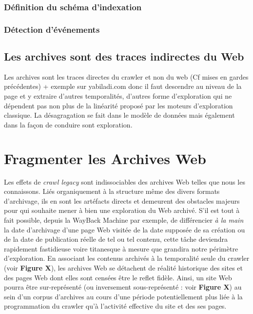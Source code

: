 \documentclass{tufte-book}
\begin{document}
\subsection{Définition du schéma d'indexation}

\subsection{Détection d'événements}

\section{Les archives sont des traces indirectes du Web}

Les archives sont les traces directes du crawler et non du web (Cf mises en gardes précédentes) + exemple sur yabiladi.com donc il faut descendre au niveau de la page et y extraire d'autres temporalités, d'autres forme d'exploration qui ne dépendent pas non plus de la linéarité proposé par les moteurs d'exploration classique.
La désagragation se fait dans le modèle de données mais également dans la façon de conduire sont exploration. 


\chapter{Fragmenter les Archives Web}

\par\noindent Les effets de \textit{crawl legacy} sont indissociables des archives Web telles que nous les connaissons. Liés organiquement à la structure même des divers formats d'archivage, ils en sont les artéfacts directs et demeurent des obstacles majeurs pour qui souhaite mener à bien une exploration du Web archivé. S'il est tout à fait possible, depuis la WayBack Machine par exemple, de différencier \textit{à la main} la date d'archivage d'une page Web visitée de la date supposée de sa création ou de la date de publication réelle de tel ou tel contenu, cette tâche deviendra rapidement fastidieuse voire titanesque à mesure que grandira notre périmètre d'exploration. En associant les contenus archivés à la temporalité seule du crawler (voir \textbf{Figure X}), les archives Web se détachent de réalité historique des sites et des pages Web dont elles sont censées être le reflet fidèle. Ainsi, un site Web pourra être sur-représenté (ou inversement sous-représenté : voir \textbf{Figure X}) au sein d'un corpus d'archives au cours d'une période potentiellement plus liée à la programmation du crawler qu'à l'activité effective du site et des ses pages.   
\end{document}
